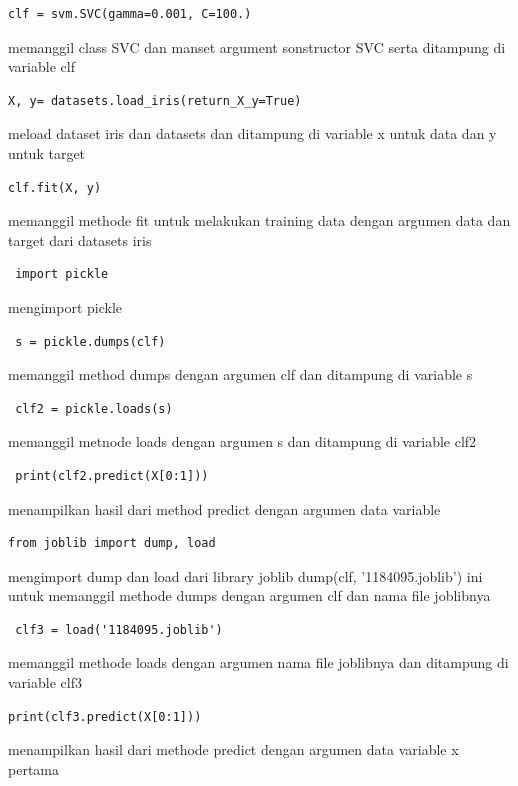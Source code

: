 \begin{enumerate}
        \begin{verbatim}clf = svm.SVC(gamma=0.001, C=100.)\end{verbatim} memanggil class SVC dan manset argument sonstructor SVC serta ditampung di variable clf
        
        \begin{verbatim}X, y= datasets.load_iris(return_X_y=True) \end{verbatim}meload dataset iris dan datasets dan ditampung di variable x untuk data dan y untuk target

        \begin{verbatim}clf.fit(X, y)\end{verbatim}memanggil methode fit untuk melakukan training data dengan argumen data dan target dari datasets iris

        \begin{verbatim} import pickle\end{verbatim} mengimport pickle
        
        \begin{verbatim} s = pickle.dumps(clf) \end{verbatim} memanggil method dumps dengan argumen clf dan ditampung di variable s
        
        \begin{verbatim} clf2 = pickle.loads(s)\end{verbatim} memanggil metnode loads dengan argumen s dan ditampung di variable clf2
        
        \begin{verbatim} print(clf2.predict(X[0:1]))\end{verbatim}menampilkan hasil dari method predict dengan argumen data variable

        \begin{verbatim}from joblib import dump, load\end{verbatim} mengimport dump dan load dari library joblib dump(clf, '1184095.joblib') ini untuk memanggil methode dumps dengan argumen clf dan nama file joblibnya
        
        \begin{verbatim} clf3 = load('1184095.joblib') \end{verbatim} memanggil methode loads dengan argumen nama file joblibnya dan ditampung di variable clf3
        
        \begin{verbatim}print(clf3.predict(X[0:1]))\end{verbatim}menampilkan hasil dari methode predict dengan argumen data variable x pertama
        

\end{enumerate}
